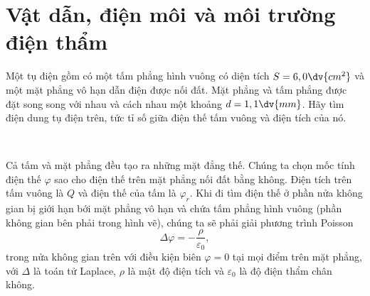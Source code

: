 \chapter{Vật dẫn, điện môi và môi trường điện thẩm}

\begin{vd}[Tụ điện kì lạ]
    Một tụ điện gồm có một tấm phẳng hình vuông có diện tích $S=6,0\dv{cm^2}$ và một mặt phẳng vô hạn dẫn điện được nối đất. Mặt phẳng và tấm phẳng được đặt song song với nhau và cách nhau một khoảng $d=1,1\dv{mm}$. Hãy tìm điện dung tụ điện trên, tức tỉ số giữa điện thế tấm vuông và điện tích của nó.
    \end{vd}
    \begin{loigiai}\\
    \begin{minipage}{0.7\textwidth}
        Cả tấm và mặt phẳng đều tạo ra những mặt đẳng thế. Chúng ta chọn mốc tính điện thế $\varphi$ sao cho điện thế trên mặt phẳng nối đất bằng không. Điện tích trên tấm vuông là $Q$ và điện thế của tấm là $\varphi_r$. Khi đi tìm điện thế ở phần nửa không gian bị giới hạn bới mặt phẳng vô hạn và chứa tấm phẳng hình vuông (phần không gian bên phải trong hình vẽ), chúng ta sẽ phải giải phương trình Poisson
        \[\Delta\varphi=-\dfrac{\rho}{\varepsilon_0}, \tag{1}\label{c181}\]
    trong nửa không gian trên với điều kiện biên $\varphi=0$ tại mọi điểm trên mặt phẳng, với $\Delta$ là toán tử Laplace, $\rho$ là mật độ điện tích và $\varepsilon_0$ là độ điện thẩm chân không.\\ 
    \end{minipage}                   
    \begin{minipage}{0.3\textwidth}
     \centering
    

\begin{tikzpicture}[x=0.75pt,y=0.75pt,yscale=-1,xscale=1]


\end{tikzpicture}
\end{minipage}
\end{loigiai}
